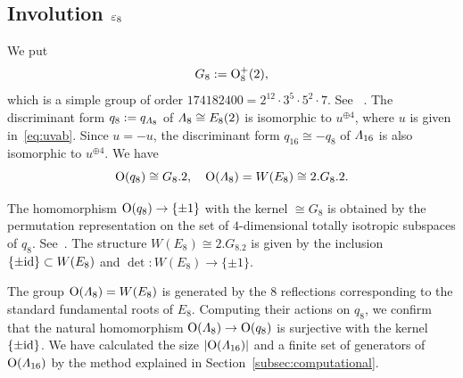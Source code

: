 \documentclass{amsart} %
\begin{document}
\subsection{Involution $\varepsilon_8$}\label{subsec:vep8}
%
We put
\[
G_8:=\mathord{\mathrm{O}}^+_8(2), 
\]
which is a simple group of order $174182400=2^{12} \cdot 3^5\cdot 5^2\cdot 7$.
See ~\cite[page 85]{MR827219}.
%
%
The discriminant form $q_8:=q_{\varLambda_8}$ of $ \varLambda_{8}\cong E_8(2)$ 
is isomorphic to $u^{\oplus 4}$,
where $u$ is given in~\eqref{eq:uvab}.
Since $u= -u$, 
the discriminant form $q_{16}\cong -q_8$ of $ \varLambda_{16}$ is also isomorphic to 
$u^{\oplus 4}$.
We have
\[
\mathord{\mathrm{O}}(q_8)\cong G_8.2, 
\quad 
\mathord{\mathrm{O}}(\varLambda_8)=W(E_8)\cong 2.G_8.2.
\]
%
\begin{remark}\label{rem:2G2}
The homomorphism $\mathord{\mathrm{O}}(q_8)\to \{\pm 1\}$ %
with the kernel $\cong G_8$
is obtained by the permutation representation on
 the set of $4$-dimensional totally isotropic subspaces of 
$q_8$.
See~\cite[Section 3.8]{Wilson2009}.
The structure $W(E_8)\cong 2.G_8.2$ is given by
the inclusion $\{\pm \mathord{\mathrm{id}}\}\subset W(E_8)$ and $\det\colon W(E_8)\to \{\pm 1\}$.
\end{remark}
%
The group $\mathord{\mathrm{O}}(\varLambda_8)=W(E_8)$
is generated by the $8$ reflections
corresponding to the standard fundamental roots of $E_8$.
Computing their actions on $q_8$,
we confirm that 
 the natural homomorphism $\mathord{\mathrm{O}}(\varLambda_8)\to \mathord{\mathrm{O}}(q_8)$ is surjective
with the kernel $\{\pm \mathord{\mathrm{id}}\}$.
We have calculated the size $|\mathord{\mathrm{O}}(\varLambda_{16})|$ and a finite set of generators of $ \mathord{\mathrm{O}}(\varLambda_{16})$
by the method 
explained in Section~\ref{subsec:computational}.
% 
\end{document}
